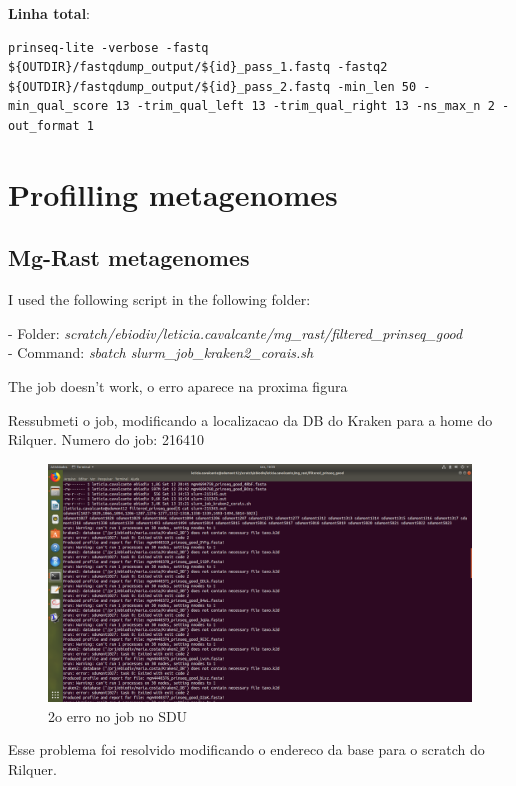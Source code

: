 \documentclass[12pt, a4paper]{report}
\begin{document}
\textbf{Linha total}:
\begin{lstlisting}[breaklines]
prinseq-lite -verbose -fastq ${OUTDIR}/fastqdump_output/${id}_pass_1.fastq -fastq2 ${OUTDIR}/fastqdump_output/${id}_pass_2.fastq -min_len 50 -min_qual_score 13 -trim_qual_left 13 -trim_qual_right 13 -ns_max_n 2 -out_format 1

\end{lstlisting}
 

\chapter{Profilling metagenomes}
\section{Mg-Rast metagenomes}
I used the following script in the following folder:

\begin{tcolorbox}[width=6.3in]
- Folder: \textit{scratch/ebiodiv/leticia.cavalcante/mg\_rast/filtered\_prinseq\_good}\\
- Command: \textit{sbatch slurm\_job\_kraken2\_corais.sh}
\end{tcolorbox}

The job doesn't work, o erro aparece na proxima figura

Ressubmeti o job, modificando a localizacao da DB do Kraken para a home do Rilquer. Numero do job: 216410
 \begin{figure}
  \centering 
  \includegraphics[width=1.0\textwidth]{figures/Captura2.png}
  \caption{2o erro no job no SDU}
 \end{figure} 

Esse problema foi resolvido modificando o endereco da base para o scratch do Rilquer.
\end{document}
